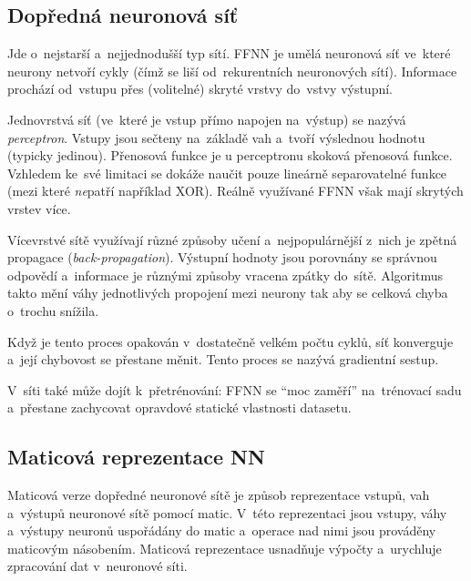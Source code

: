 \subsection{Dopředná neuronová síť}

Jde o~nejstarší a~nejjednodušší typ sítí.
FFNN je umělá neuronová síť ve~které neurony netvoří cykly (čímž se liší od~rekurentních neuronových sítí).
Informace prochází od~vstupu přes (volitelné) skryté vrstvy do~vstvy výstupní.

Jednovrstvá síť (ve~které je vstup přímo napojen na~výstup) se nazývá \emph{perceptron}.
Vstupy jsou sečteny na~základě vah a~tvoří výslednou hodnotu (typicky jedinou). Přenosová funkce je u perceptronu 
skoková přenosová funkce.
Vzhledem ke~své limitaci se dokáže naučit pouze lineárně separovatelné funkce (mezi které \emph{ne}patří například XOR).
Reálně využívané FFNN však mají skrytých vrstev více.

Vícevrstvé sítě využívají různé způsoby učení a~nejpopulárnější z~nich je zpětná propagace (\emph{back-propagation}).
Výstupní hodnoty jsou porovnány se správnou odpovědí a~informace je různými způsoby vracena zpátky do~sítě.
Algoritmus takto mění váhy jednotlivých propojení mezi neurony tak aby se celková chyba o~trochu snížila.

Když je tento proces opakován v~dostatečně velkém počtu cyklů, síť konverguje a~její chybovost se přestane měnit.
Tento proces se nazývá gradientní sestup.

V~síti také může dojít k~přetrénování: FFNN se \enquote{moc zaměří} na~trénovací sadu a~přestane zachycovat opravdové statické vlastnosti datasetu.

\subsection{Maticová reprezentace NN}

Maticová verze dopředné neuronové sítě je způsob reprezentace vstupů, vah a~výstupů neuronové sítě pomocí matic. V~této reprezentaci jsou vstupy, váhy a~výstupy neuronů uspořádány do matic a~operace nad nimi jsou prováděny maticovým násobením. Maticová reprezentace usnadňuje výpočty a~urychluje zpracování dat v~neuronové síti.

